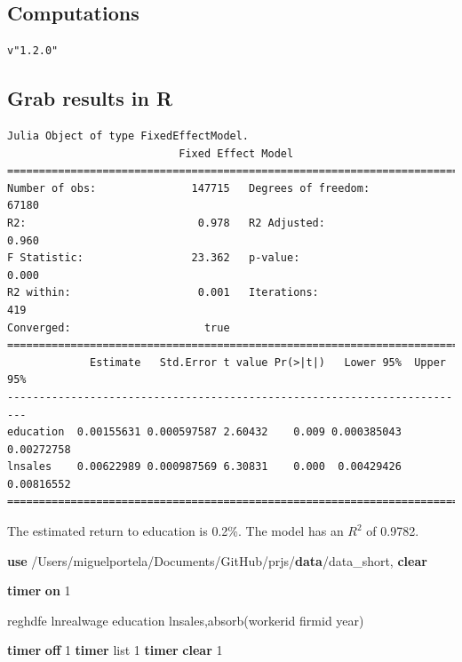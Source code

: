 \documentclass[
  12pt,
]{article}
\newenvironment{Shaded}{\begin{snugshade}}{\end{snugshade}}
\newcommand{\FunctionTok}[1]{\textcolor[rgb]{0.00,0.00,0.00}{#1}}
\newcommand{\KeywordTok}[1]{\textcolor[rgb]{0.13,0.29,0.53}{\textbf{#1}}}
\newcommand{\NormalTok}[1]{#1}
\newcommand{\OtherTok}[1]{\textcolor[rgb]{0.56,0.35,0.01}{#1}}
\begin{document}
\hypertarget{computations}{%
\subsection{Computations}\label{computations}}

\begin{verbatim}
v"1.2.0"
\end{verbatim}

\hypertarget{grab-results-in-r}{%
\subsection{Grab results in R}\label{grab-results-in-r}}

\begin{verbatim}
Julia Object of type FixedEffectModel.
                           Fixed Effect Model                           
=========================================================================
Number of obs:               147715   Degrees of freedom:           67180
R2:                           0.978   R2 Adjusted:                  0.960
F Statistic:                 23.362   p-value:                      0.000
R2 within:                    0.001   Iterations:                     419
Converged:                     true   
=========================================================================
             Estimate   Std.Error t value Pr(>|t|)   Lower 95%  Upper 95%
-------------------------------------------------------------------------
education  0.00155631 0.000597587 2.60432    0.009 0.000385043 0.00272758
lnsales    0.00622989 0.000987569 6.30831    0.000  0.00429426 0.00816552
=========================================================================
\end{verbatim}

\vspace{0.3cm}

The estimated return to education is 0.2\%. The model has an \(R^2\) of 0.9782.

\vspace{0.3cm}

\begin{Shaded}
\begin{Highlighting}[]

\KeywordTok{use}\NormalTok{ /Users/miguelportela/Documents/GitHub/prjs/}\KeywordTok{data}\NormalTok{/data_short, }\KeywordTok{clear}

\KeywordTok{timer} \KeywordTok{on}\NormalTok{ 1}

\NormalTok{    reghdfe lnrealwage education lnsales,absorb(workerid firmid }\FunctionTok{year}\NormalTok{)}

\KeywordTok{timer} \KeywordTok{off}\NormalTok{ 1}
\KeywordTok{timer} \OtherTok{list}\NormalTok{ 1}
\KeywordTok{timer} \KeywordTok{clear}\NormalTok{ 1}
\end{Highlighting}
\end{Shaded}
\end{document}
